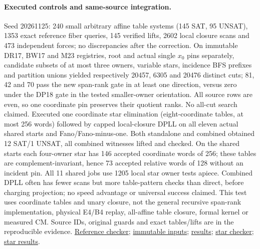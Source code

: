 \documentclass[11pt]{article}
\begin{document}
\paragraph{Executed controls and same-source integration.}
Seed 20261125: 240 small arbitrary affine table systems (145 SAT, 95 UNSAT), 1353 exact reference fiber queries, 145 verified lifts, 2602 local closure scans and 473 independent forces; no discrepancies after the correction. On immutable DR17, BW17 and M23 registries, root and actual single $x_0$ pins separately, candidate subsets of at most three owners, variable stars, incidence BFS prefixes and partition unions yielded respectively 20457, 6305 and 20476 distinct cuts; 81, 42 and 70 pass the new span-rank gate in at least one direction, versus zero under the DP18 gate in the tested smaller-owner orientation. All source rows are even, so one coordinate pin preserves their quotient ranks. No all-cut search claimed. Executed one coordinate star elimination (eight-coordinate tables, at most 256 words) followed by capped local-closure DPLL on all eleven actual shared starts and Fano/Fano-minus-one. Both standalone and combined obtained 12 SAT/1 UNSAT, all combined witnesses lifted and checked. On the shared starts each four-owner star has 146 accepted coordinate words of 256; these tables are complement-invariant, hence 73 accepted relative words of 128 without an incident pin. All 11 shared jobs use 1205 local star owner tests apiece. Combined DPLL often has fewer scans but more table-pattern checks than direct, before charging projection; no speed advantage or universal success claimed. This test uses coordinate tables and unary closure, not the general recursive span-rank implementation, physical E4/B4 replay, all-affine table closure, formal kernel or measured CM. Source IDs, original guards and exact tables/lifts are in the reproducible evidence. \href{https://github.com/j15marti/pnp/commit/ea73a2617b2a3c1ad4e038d47f1924ad4d0ffb2f}{Reference checker}; \href{https://github.com/j15marti/pnp/commit/40881304c3fb5cff076fb8f52142a55d44b9291d}{immutable inputs}; \href{https://github.com/j15marti/pnp/commit/fdd0323f530aa37a30bdfb76752d344bb13b7dd5}{results}; \href{https://github.com/j15marti/pnp/commit/d07edfa6a2e0880145a1101350f6abde08db1d0d}{star checker}; \href{https://github.com/j15marti/pnp/commit/2349f95352f7b93ba2ced149478ced726e7ad1e4}{star results}.
\end{document}
